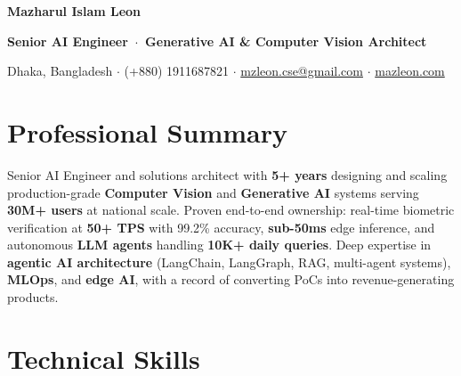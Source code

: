 \documentclass[10pt,a4paper]{article}
\newcommand{\name}[1]{{\centering\LARGE\textbf{\textcolor{headerblue}{#1}}\par}}
\newcommand{\tagline}[1]{{\centering\normalsize\textbf{\color{black!80}#1}\par}}
\newcommand{\contact}[1]{{\centering\small\color{black!70}#1\par}}
\begin{document}
\name{Mazharul Islam Leon}
\vspace{0.2em}
\tagline{Senior AI Engineer \,$\cdot$\, Generative AI \& Computer Vision Architect}

\contact{%
  Dhaka, Bangladesh \hspace{0.3em}$\cdot$\hspace{0.3em} (+880) 1911687821 \hspace{0.3em}$\cdot$\hspace{0.3em}
  \href{mailto:mzleon.cse@gmail.com}{mzleon.cse@gmail.com} \hspace{0.3em}$\cdot$\hspace{0.3em}
  \href{https://mazleon.com}{mazleon.com}
}

\vspace{0.4em}

\section{Professional Summary}
Senior AI Engineer and solutions architect with \textbf{5+ years} designing and scaling production-grade \textbf{Computer Vision} and \textbf{Generative AI} systems serving \textbf{30M+ users} at national scale. Proven end-to-end ownership: real-time biometric verification at \textbf{50+ TPS} with 99.2\% accuracy, \textbf{sub-50ms} edge inference, and autonomous \textbf{LLM agents} handling \textbf{10K+ daily queries}. Deep expertise in \textbf{agentic AI architecture} (LangChain, LangGraph, RAG, multi-agent systems), \textbf{MLOps}, and \textbf{edge AI}, with a record of converting PoCs into revenue-generating products.

\section{Technical Skills}
\end{document}
